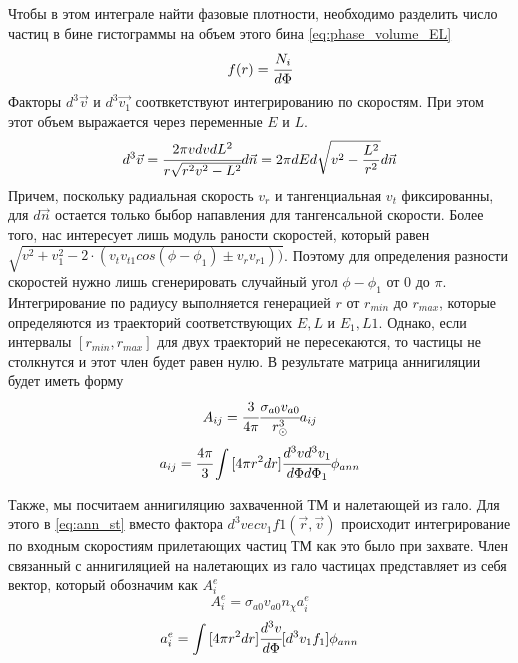 Чтобы в этом интеграле найти фазовые плотности, необходимо разделить число частиц в бине гистограммы на объем этого бина \ref{eq:phase_volume_EL}
\begin{equation}
	\label{eq:phase_dens}
	f(r) = \cfrac{N_i}{d\Phi}
\end{equation}
Факторы $d^3\vec{v}$ и $d^3\vec{v_1}$ соотвкетствуют интегрированию по скоростям. При этом этот объем выражается через переменные $E$ и $L$.
\begin{equation}
	\label{eq:velocity_dens}
	d^{3}\vec{v} = \cfrac{2\pi vdvdL^{2}}{r\sqrt{r^{2}v^{2} - L^{2}}} d\vec{n} = 
	2\pi dEd\sqrt{v^2-\frac{L^2}{r^2}} d\vec{n}
\end{equation}
Причем, поскольку радиальная скорость $v_r$ и тангенциальная $v_{t}$ фиксированны, для $d\vec{n}$ остается только быбор напавления для тангенсальной скорости. Более того, нас интересует лишь модуль раности скоростей, который равен $\sqrt{v^2 + v_{1}^2 - 2\cdot
(v_{t}v_{t1} cos(\phi-\phi_1) \pm v_{r}v_{r1}))}$. Поэтому для определения разности скоростей нужно лишь сгенерировать случайный угол $\phi-\phi_1$ от $0$ до $\pi$.
Интегрирование по радиусу выполняется генерацией $r$ от $r_{min}$ до $r_{max}$, которые определяются из траекторий соответствующих $E, L$ и $E_1, L1$. Однако, если интервалы $[r_{min}, r_{max}]$ для двух траекторий не пересекаются, то частицы не столкнутся и этот член будет равен нулю.
В результате матрица аннигиляции будет иметь форму
\begin{equation}
	\label{eq:ANN_full}
	A_{ij} = \cfrac{3}{4\pi}\cfrac{\sigma_{a0} v_{a0}}{r_{\odot}^3} a_{ij}
\end{equation}
\begin{equation}
	\label{eq:ann_detail}
	a_{ij} =\cfrac{4\pi}{3} \int{[4\pi r^2dr] \cfrac{d^3vd^3v_1}{d\Phi d\Phi_1}} \phi_{ann}
\end{equation}

Также, мы посчитаем аннигиляцию захваченной ТМ и налетающей из гало. Для этого в \ref{eq:ann_st} вместо фактора $d^3vec{v_1}f1(\vec{r},\vec{v})$ происходит интегрирование по входным скоростиям прилетающих частиц ТМ как это было при захвате. Член связанный с аннигиляцией на налетающих из гало частицах представляет из себя вектор, который обозначим как $A^e_i$
\begin{equation}
	\label{eq:ANN_full}
	A^e_{i} = \sigma_{a0} v_{a0} n_{\chi} a^e_{i}
\end{equation}
\begin{equation}
	\label{eq:ann_full}
	a^e_{i} = \int{[4\pi r^2dr] \cfrac{d^3v}{d\Phi}} [d^3v_1f_1] \phi_{ann}
\end{equation} 

